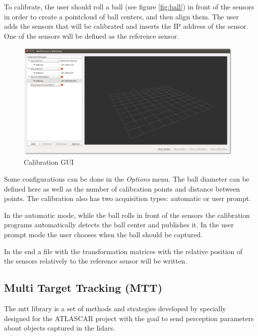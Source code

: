 To calibrate, the user should roll a ball (see figure \ref{fig:ball}) in front of the sensors in order to create a pointcloud of ball centers, and then align them. The user adds the sensors that will be calibrated and inserts the IP address of the sensor. One of the sensors will be defined as the reference sensor. 

\begin{figure}[htp]
	
	\centering
	\includegraphics[width=0.99\textwidth]{capcalib/imgs/calibgui.png}
	
	\caption{Calibration GUI}
	\label{fig:calibgui}
	
\end{figure}

Some configurations can be done in the \textit{Options} menu. The ball diameter can be defined here as well as the number of calibration points and distance between points. The calibration also has two acquisition types: automatic or user prompt. 

In the automatic mode, while the ball rolls in front of the sensors the calibration programs automatically detects the ball center and publishes it. In the user prompt mode the user chooses when the ball should be captured.

In the end a file with the transformation matrices with the relative position of the sensors relatively to the reference sensor will be written.

\subsection{Multi Target Tracking (MTT)}

The \gls{mtt} library is a set of methods and strategies developed by \cite{SoaresDeAlmeida2016a} specially designed for the ATLASCAR project with the goal to send perception parameters about objects captured in the \gls{lidar}s. 

